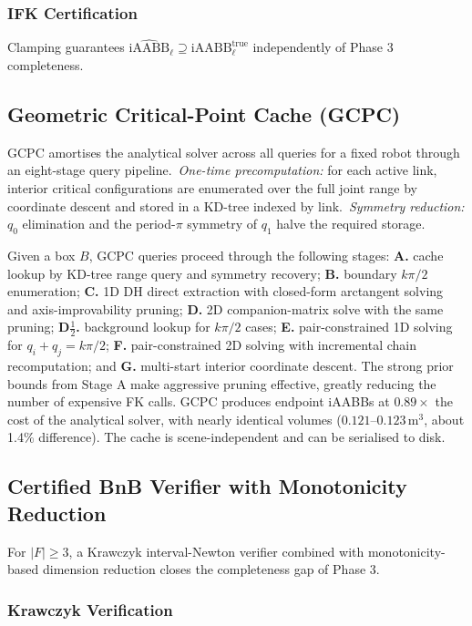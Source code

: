 \documentclass[journal]{IEEEtran}
\newcommand{\iAABB}{\mathrm{iAABB}}
\begin{document}
\subsubsection{IFK Certification}

Clamping guarantees
$\widehat{\iAABB}_\ell \supseteq \iAABB^{\mathrm{true}}_\ell$
independently of Phase 3 completeness.

\subsection{Geometric Critical-Point Cache (GCPC)}\label{sec:gcpc}

GCPC amortises the analytical solver across all queries for a fixed
robot through an eight-stage query pipeline.\
\emph{One-time precomputation:} for each active link, interior critical
configurations are enumerated over the full joint range by coordinate
descent and stored in a KD-tree indexed by link.\
\emph{Symmetry reduction:} $q_0$ elimination and the period-$\pi$
symmetry of $q_1$ halve the required storage.

Given a box $B$, GCPC queries proceed through the following stages:
\textbf{A.} cache lookup by KD-tree range query and symmetry recovery;
\textbf{B.} boundary $k\pi/2$ enumeration;
\textbf{C.} 1D DH direct extraction with closed-form arctangent solving and
axis-improvability pruning;
\textbf{D.} 2D companion-matrix solve with the same pruning;
\textbf{D$\frac{1}{2}$.} background lookup for $k\pi/2$ cases;
\textbf{E.} pair-constrained 1D solving for
$q_i + q_j = k\pi/2$;
\textbf{F.} pair-constrained 2D solving with incremental chain
recomputation; and
\textbf{G.} multi-start interior coordinate descent.
The strong prior bounds from Stage A make aggressive pruning effective,
greatly reducing the number of expensive FK calls. GCPC produces
endpoint iAABBs at $0.89{\times}$ the cost of the analytical solver,
with nearly identical volumes
($0.121$--$0.123$\,m$^3$, about 1.4\% difference). The cache is
scene-independent and can be serialised to disk.

\subsection{Certified BnB Verifier with Monotonicity Reduction}\label{sec:bnb}

For $|F| \geq 3$, a Krawczyk interval-Newton verifier combined with
monotonicity-based dimension reduction closes the completeness gap of
Phase 3.

\subsubsection{Krawczyk Verification}
\end{document}
